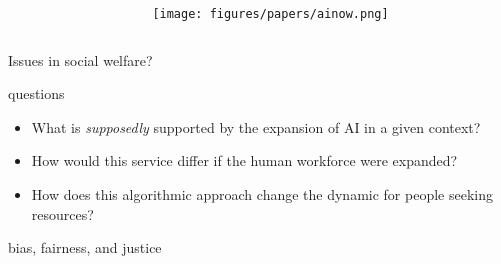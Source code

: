 \documentclass[aspectratio=169,17pt]{beamer} %
\begin{document}
\begin{frame}[plain]

\begin{columns}
\begin{column}{0.5\textwidth}

\centering
{}

\end{column}
\begin{column}{0.5\textwidth}
    \texttt{[image: figures/papers/ainow.png]}

\end{column}
\end{columns}


\end{frame}


\begin{frame}[standout]

Issues in social welfare?

\end{frame}


\begin{frame}[plain]


\centering
{}


\end{frame}

\begin{frame}{questions}
\begin{itemize}
    \item What is \emph{supposedly} supported by the expansion of AI in a given context?
    \item How would this service differ if the human workforce were expanded?
    \item How does this algorithmic approach change the dynamic for people seeking resources?
\end{itemize}
\end{frame}






\begin{frame}[plain]


\end{frame}


\begin{frame}{bias, fairness, and justice}


\end{frame}
\end{document}
